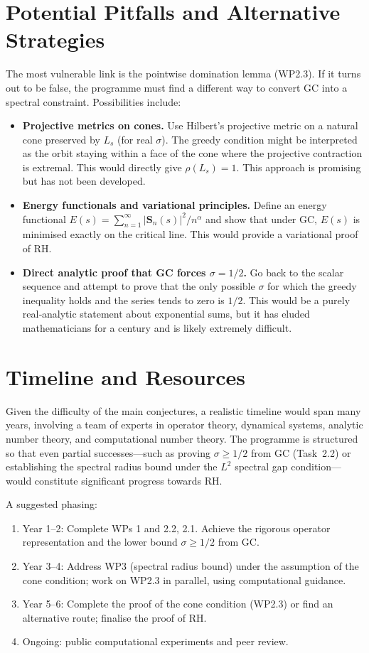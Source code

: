 \documentclass[11pt,a4paper]{article}
\begin{document}
\section{Potential Pitfalls and Alternative Strategies}
The most vulnerable link is the pointwise domination lemma (WP2.3).  If it turns out to be false, the programme must find a different way to convert GC into a spectral constraint.  Possibilities include:

\begin{itemize}
\item \textbf{Projective metrics on cones.}  Use Hilbert's projective metric on a natural cone preserved by $L_s$ (for real $\sigma$).  The greedy condition might be interpreted as the orbit staying within a face of the cone where the projective contraction is extremal.  This would directly give $\rho(L_s)=1$.  This approach is promising but has not been developed.
\item \textbf{Energy functionals and variational principles.}  Define an energy functional $E(s) = \sum_{n=1}^{\infty} |\mathbf{S}_n(s)|^2 / n^{\alpha}$ and show that under GC, $E(s)$ is minimised exactly on the critical line.  This would provide a variational proof of RH.
\item \textbf{Direct analytic proof that GC forces $\sigma=1/2$.}  Go back to the scalar sequence and attempt to prove that the only possible $\sigma$ for which the greedy inequality holds and the series tends to zero is $1/2$.  This would be a purely real‑analytic statement about exponential sums, but it has eluded mathematicians for a century and is likely extremely difficult.
\end{itemize}

\section{Timeline and Resources}
Given the difficulty of the main conjectures, a realistic timeline would span many years, involving a team of experts in operator theory, dynamical systems, analytic number theory, and computational number theory.  The programme is structured so that even partial successes—such as proving $\sigma \ge 1/2$ from GC (Task~2.2) or establishing the spectral radius bound under the \(L^2\) spectral gap condition—would constitute significant progress towards RH.

A suggested phasing:
\begin{enumerate}[nosep]
\item Year 1–2: Complete WPs 1 and 2.2, 2.1.  Achieve the rigorous operator representation and the lower bound $\sigma \ge 1/2$ from GC.
\item Year 3–4: Address WP3 (spectral radius bound) under the assumption of the cone condition; work on WP2.3 in parallel, using computational guidance.
\item Year 5–6: Complete the proof of the cone condition (WP2.3) or find an alternative route; finalise the proof of RH.
\item Ongoing: public computational experiments and peer review.
\end{enumerate}
\end{document}
